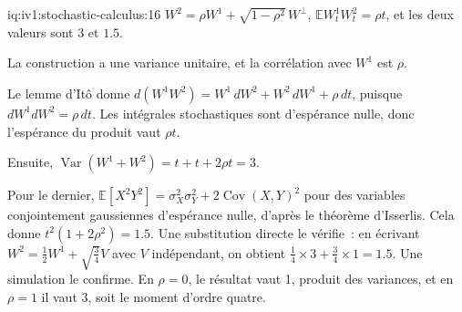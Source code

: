 \begin{solution}{iq:iv1:stochastic-calculus:16}
$W^2 = \rho W^1 + \sqrt{1 - \rho^2}\,W^\perp$, $\mathbb{E}W^1_tW^2_t = \rho t$, et les deux valeurs sont 3 et $1.5$.

La construction a une variance unitaire, et la corrélation avec $W^1$ est $\rho$.

Le lemme d'Itô donne $d(W^1W^2) = W^1\,dW^2 + W^2\,dW^1 + \rho\,dt$, puisque $dW^1dW^2 = \rho\,dt$. Les intégrales stochastiques sont d'espérance nulle, donc l'espérance du produit vaut $\rho t$.

Ensuite, $\operatorname{Var}(W^1 + W^2) = t + t + 2\rho t = 3$.

Pour le dernier, $\mathbb{E}[X^2Y^2] = \sigma_X^2\sigma_Y^2 + 2\operatorname{Cov}(X, Y)^2$ pour des variables conjointement gaussiennes d'espérance nulle, d'après le théorème d'Isserlis. Cela donne $t^2(1 + 2\rho^2) = 1.5$. Une substitution directe le vérifie~: en écrivant $W^2 = \frac12W^1 + \sqrt{\frac34}V$ avec $V$ indépendant, on obtient $\frac14 \times 3 + \frac34 \times 1 = 1.5$. Une simulation le confirme. En $\rho = 0$, le résultat vaut 1, produit des variances, et en $\rho = 1$ il vaut 3, soit le moment d'ordre quatre.



\end{solution}

